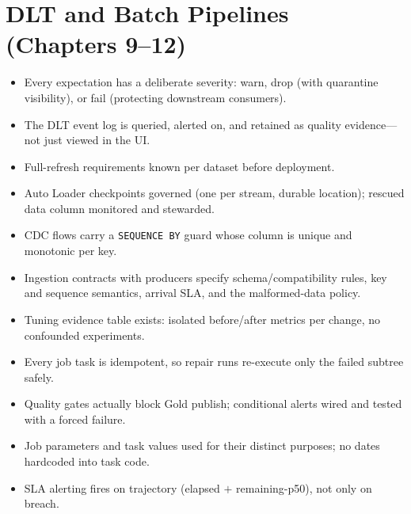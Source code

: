 \section{DLT and Batch Pipelines (Chapters 9--12)}
%
\begin{itemize}
    \item[$\square$] Every expectation has a deliberate severity: warn, drop (with quarantine
    visibility), or fail (protecting downstream consumers).
    \item[$\square$] The DLT event log is queried, alerted on, and retained as quality
    evidence---not just viewed in the UI.
    \item[$\square$] Full-refresh requirements known per dataset before deployment.
    \item[$\square$] Auto Loader checkpoints governed (one per stream, durable location); rescued
    data column monitored and stewarded.
    \item[$\square$] CDC flows carry a \texttt{SEQUENCE BY} guard whose column is unique and
    monotonic per key.
    \item[$\square$] Ingestion contracts with producers specify schema/compatibility rules, key
    and sequence semantics, arrival SLA, and the malformed-data policy.
    \item[$\square$] Tuning evidence table exists: isolated before/after metrics per change, no
    confounded experiments.
    \item[$\square$] Every job task is idempotent, so repair runs re-execute only the failed
    subtree safely.
    \item[$\square$] Quality gates actually block Gold publish; conditional alerts wired and
    tested with a forced failure.
    \item[$\square$] Job parameters and task values used for their distinct purposes; no dates
    hardcoded into task code.
    \item[$\square$] SLA alerting fires on trajectory (elapsed $+$ remaining-p50), not only on
    breach.
\end{itemize}

